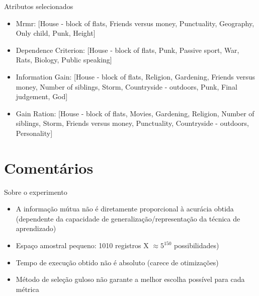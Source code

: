 \documentclass{beamer}
\begin{document}
\begin{frame}{Atributos selecionados}
	\begin{itemize}
		\item Mrmr: [House - block of flats, Friends versus money, Punctuality, Geography, Only child, Punk, Height] 
		\item Dependence Criterion: [House - block of flats, Punk, Passive sport, War, Rats, Biology, Public speaking] 
		\item Information Gain: [House - block of flats, Religion, Gardening, Friends versus money, Number of siblings, Storm, Countryside - outdoors, Punk, Final judgement, God] 
		\item Gain Ration: [House - block of flats, Movies, Gardening, Religion, Number of siblings, Storm, Friends versus money, Punctuality, Countryside - outdoors, Personality] 
	\end{itemize}
\end{frame}

\section{Comentários}

\begin{frame}{Sobre o experimento}
	\begin{itemize}
		\item A informação mútua não é diretamente proporcional à acurácia obtida (dependente da capacidade de generalização/representação da técnica de aprendizado)
		\item Espaço amostral pequeno: 1010 registros X $\approx 5^{150}$ possibilidades)
		\item Tempo de execução obtido não é absoluto (carece de otimizações)
		\item Método de seleção guloso não garante a melhor escolha possível para cada métrica
	\end{itemize}
\end{frame}
\end{document}
